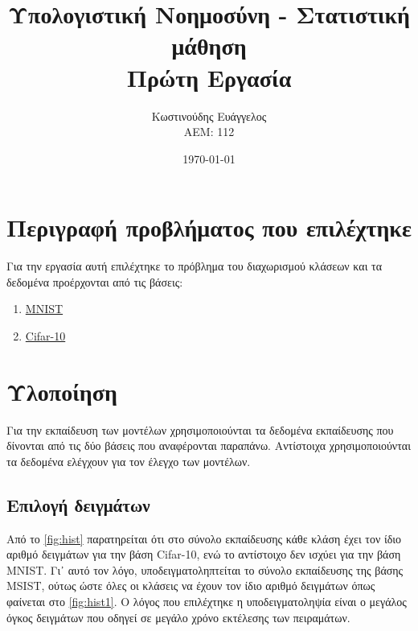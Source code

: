 \documentclass[a4paper]{article}
\title{Υπολογιστική Νοημοσύνη - Στατιστική μάθηση \\ Πρώτη Εργασία}
\author{Κωστινούδης Ευάγγελος \\ΑΕΜ: 112}
\date{\today}
\begin{document}
\maketitle
{}
\newpage
{}

\section{Περιγραφή προβλήματος που επιλέχτηκε}

Για την εργασία αυτή επιλέχτηκε το πρόβλημα του διαχωρισμού κλάσεων και τα
δεδομένα προέρχονται από τις βάσεις:

\begin{enumerate}
\item \href{http://yann.lecun.com/exdb/mnist/}{MNIST}
\item \href{https://www.cs.toronto.edu/~kriz/cifar.html}{Cifar-10}
\end{enumerate}


\section{Υλοποίηση}

Για την εκπαίδευση των μοντέλων χρησιμοποιούνται τα δεδομένα εκπαίδευσης που
δίνονται από τις δύο βάσεις που αναφέρονται παραπάνω. Αντίστοιχα
χρησιμοποιούνται τα δεδομένα ελέγχουν για τον έλεγχο των μοντέλων.

\subsection{Επιλογή δειγμάτων}

Από το \autoref{fig:hist} παρατηρείται ότι στο σύνολο εκπαίδευσης κάθε κλάση έχει
τον ίδιο αριθμό δειγμάτων για την βάση Cifar-10, ενώ το αντίστοιχο δεν ισχύει
για την βάση MNIST. Γι᾽ αυτό τον λόγο, υποδειγματοληπτείται το σύνολο
εκπαίδευσης της βάσης MSIST, ούτως ώστε όλες οι κλάσεις να έχουν τον ίδιο αριθμό
δειγμάτων όπως φαίνεται στο \autoref{fig:hist1}. Ο λόγος που επιλέχτηκε η
υποδειγματοληψία είναι ο μεγάλος όγκος δειγμάτων που οδηγεί σε μεγάλο χρόνο
εκτέλεσης των πειραμάτων.
\end{document}
